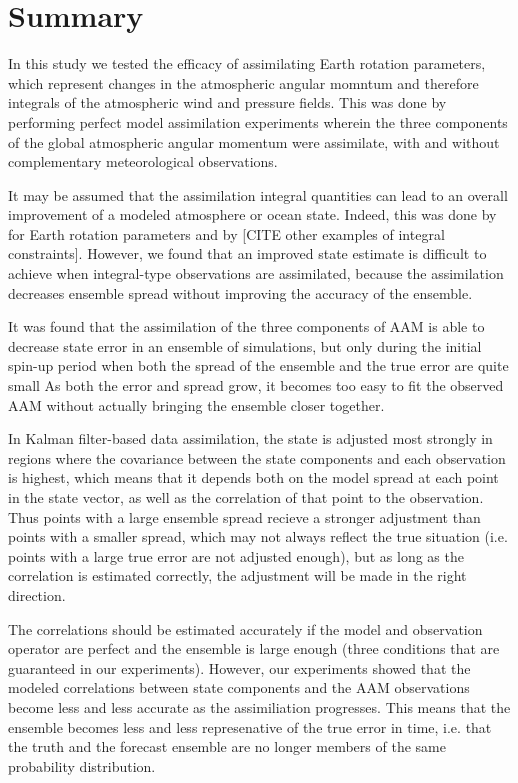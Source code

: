 \section{Summary}  

In this study we tested the efficacy of assimilating Earth rotation parameters, which represent changes in the atmospheric angular momntum and therefore integrals of the atmospheric wind and pressure fields.  
This was done by performing perfect model assimilation experiments wherein the three components of the global atmospheric angular momentum were assimilate, with and without complementary meteorological observations. 

It may be assumed that the assimilation integral quantities can lead to an overall improvement of a modeled atmosphere or ocean state.
Indeed, this was done by \citet{Saynisch2010,Saynisch2011,Saynisch2012} for Earth rotation parameters and by \textcolor{alert}{[CITE other examples of integral constraints]}.
However, we found that an improved state estimate is difficult to achieve when integral-type observations are assimilated, \textcolor{unsure}{because the assimilation decreases ensemble spread without improving the accuracy of the ensemble.}


It was found that the assimilation of the three components of AAM is able to decrease state error in an ensemble of simulations, but only during the initial spin-up period when both  the spread of the ensemble and the true error are quite small
As both the error and spread grow, it becomes too easy to fit the observed AAM without actually bringing the ensemble closer together.

In Kalman filter-based data assimilation, the state is adjusted most strongly in regions where the covariance between the state components and each observation is highest, which means that it depends both on the model spread at each point in the state vector, as well as the correlation of that point to the observation.  
Thus points with a large ensemble spread recieve a stronger adjustment than points with a smaller spread, which may not always reflect the true situation (i.e. points with a large true error are not adjusted enough), but as long as the correlation is estimated correctly, the adjustment will be made in the right direction.  

\textcolor{unsure}{The correlations should be estimated accurately if the model and observation operator are perfect and the ensemble is large enough (three conditions that are guaranteed in our experiments).  
However, our experiments showed that the modeled correlations between state components and the AAM observations become less and less accurate as the assimiliation progresses. 
This means that the ensemble becomes less and less represenative of the true error in time, i.e. that the truth and the forecast ensemble are no longer members of the same probability distribution. 
 }



